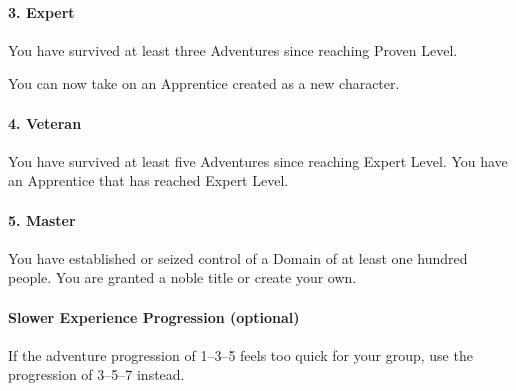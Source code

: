 \documentclass[itdr]{subfiles}
\begin{document}
\paragraph{3. Expert}
You have survived at least three Adventures since reaching Proven Level.

You can now take on an Apprentice created as a new character.

\paragraph{4. Veteran}
You have survived at least five Adventures since reaching Expert Level. You have an Apprentice that has reached Expert Level.

\paragraph{5. Master}
You have established or seized control of a Domain of at least one hundred people. You are granted a noble title or create your own.

\vfill

\begin{dbox}
	\paragraph{Slower Experience Progression (optional)}
	If the adventure progression of 1--3--5 feels too quick for your group, use the progression of 3--5--7 instead.
\end{dbox}

\vfill
\end{document}
